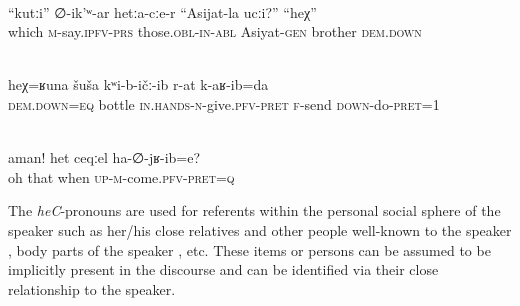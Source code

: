 \begin{exe}
	\\	\label{Who, he says to them, is Asijats brother? This one}
	\gll	``kutːi''	∅-ik'ʷ-ar	hetːa-cːe-r	``Asijat-la	ucːi?'' 	``heχ'' \\
		which	\textsc{m}-say.\textsc{ipfv}-\textsc{prs}	those.\textsc{obl}-\textsc{in}-\textsc{abl}	Asiyat-\textsc{gen}	brother \textsc{dem.down}\\
	\glt	{}

	 \\	\label{He gave me such a bottle and sent me away}
	\gll	heχ=ʁuna	šuša	kʷi-b-ičː-ib	r-at	k-aʁ-ib=da\\
		\textsc{dem.down=eq}	bottle	\textsc{in.hands}-\textsc{n}-give.\textsc{pfv}-\textsc{pret}	\textsc{f}-send	\textsc{down}-do-\textsc{pret}=1 \\
	\glt	{}

	\\	\label{[referring to a boy that turned up unexpectedly during the conversation}
	\gll	aman!		het	ceqːel	ha-∅-jʁ-ib=e?\\
		oh		that	when	\textsc{up}-\textsc{m}-come.\textsc{pfv}-\textsc{pret}=\textsc{q}\\
	\glt	{}
\end{exe}

The \textit{heC}-pronouns are used for referents within the personal social sphere of the speaker such as her/his close relatives and other people well-known to the speaker , body parts of the speaker , etc. These items or persons can be assumed to be implicitly present in the discourse and can be identified via their close relationship to the speaker.

